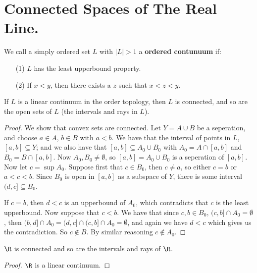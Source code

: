 
\section{Connected Spaces of The Real Line.}

\begin{definition}
    We call a simply ordered set $L$ with  $|L|>1$ a  \textbf{ordered contunuum} if:
        \begin{enumerate}
            \item[(1)] $L$ has the least upperbound property.

            \item[(2)] If $x<y$, then there exists a  $z$ such that  $x<z<y$.
        \end{enumerate}
\end{definition}

\begin{theorem}\label{3.2.1}
    If $L$ is a linear continuum in the order topology, then  $L$ is connected, and so are the open
    sets of  $L$  (the intervals and rays in $L$).
\end{theorem}
\begin{proof}
    We show that convex sets are connected. Let $Y=A \cup B$ be a seperation, and choose  $a \in A$,
     $b \in B$ with  $a<b$. We have that the interval of points in  $L$,  $[a,b] \subseteq Y$; and
     we also have that $[a,b] \subseteq A_0 \cup B_0$ with $ A_0=A \cap [a,b]$ and $ B_0=B \cap
     [a,b]$. Now $ A_0,B_0 \neq \emptyset$, so $[a,b]=A_0 \cup B_0$ is a seperation of $[a,b]$. Now
     let $c=\sup{A_0}$. Suppose first that $c \in B_0$, then $c \neq a$, so either $c=b$ or  $a<c<b$.
     Since  $ B_0$ is open in $[a,b]$ as a subspace of $Y$, there is some interval  $(d,c] \subseteq
     B_0$.

     If $c=b$, then  $d<c$ is an upperbound of  $ A_0$, which contradicts that $c$ is the least
     upperbound. Now suppose that $c<b$. We have that since  $c,b \in B_0$, $(c,b] \cap A_0=
     \emptyset$, then $(b,d] \cap A_0=(d,c] \cap (c,b] \cap A_0 = \emptyset$, and again we have
     $d<c$ which gives us the contradiction. So  $c \notin B$. By similar reasoning  $c \notin A_0$.
\end{proof}
\begin{corollary}
    $\R$ is connected and so are the intervals and rays of  $\R$.
\end{corollary}
\begin{proof}
    $\R$ is a linear continuum.
\end{proof}

